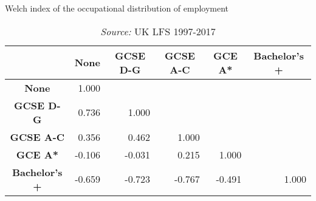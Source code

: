 \begin{table}[htbp]
	\centering
	\caption{Welch index of the occupational distribution of employment}
	\begin{tabular}{c|rrrrr}
		& \multicolumn{1}{c}{\textbf{None}} & \multicolumn{1}{c}{\textbf{GCSE D-G}} & \multicolumn{1}{c}{\textbf{GCSE A-C}} & \multicolumn{1}{c}{\textbf{GCE A*}} & \multicolumn{1}{c}{\textbf{Bachelor's +}} \\
		\midrule
		\textbf{None} & 1.000 &       &       &       &  \\
		\textbf{GCSE D-G} & \cellcolor[rgb]{ .973,  .412,  .42}0.736 & 1.000 &       &       &  \\
		\textbf{GCSE A-C} & \cellcolor[rgb]{ .988,  .655,  .467}0.356 & \cellcolor[rgb]{ .984,  .588,  .455}0.462 & 1.000 &       &  \\
		\textbf{GCE A*} & \cellcolor[rgb]{ .965,  .91,  .514}-0.106 & \cellcolor[rgb]{ 1,  .898,  .514}-0.031 & \cellcolor[rgb]{ .992,  .745,  .486}0.215 & 1.000 &  \\
		\textbf{Bachelor's +} & \cellcolor[rgb]{ .482,  .769,  .486}-0.659 & \cellcolor[rgb]{ .424,  .753,  .482}-0.723 & \cellcolor[rgb]{ .388,  .745,  .482}-0.767 & \cellcolor[rgb]{ .627,  .812,  .494}-0.491 & 1.000 \\
	\end{tabular}%
	\caption*{\footnotesize\textit{Source:} UK LFS 1997-2017}
\end{table}%